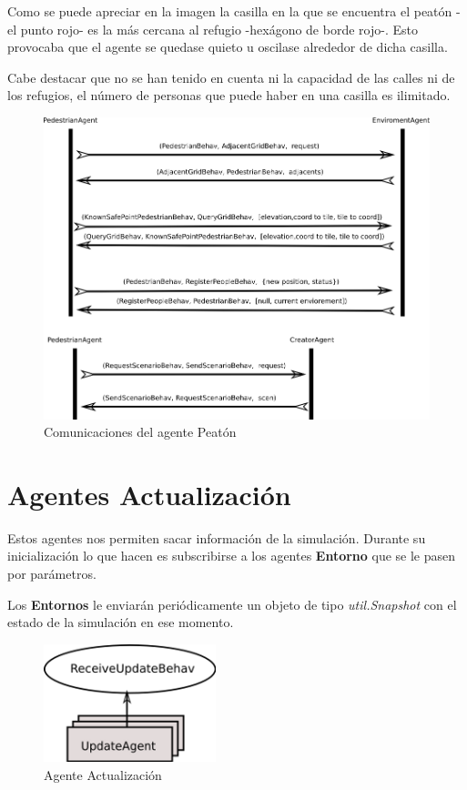 Como se puede apreciar en la imagen la casilla en la que se encuentra el peatón
-el punto rojo- es la más cercana al refugio -hexágono de borde rojo-. Esto
provocaba que el agente se quedase quieto u oscilase alrededor de dicha casilla.

Cabe destacar que no se han tenido en cuenta ni la capacidad de las calles ni
de los refugios, el número de personas que puede haber en una casilla es
ilimitado.

\begin{figure}[H]
 \centering
 \includegraphics[width=135mm]{figuras/cap5/com_pedestrian.png}
 \caption{Comunicaciones del agente Peatón}
\end{figure}

\section{Agentes Actualización}

Estos agentes nos permiten sacar información de la simulación. Durante su
inicialización lo que hacen es subscribirse a los agentes {\bf Entorno} que se
le pasen por parámetros.

Los {\bf Entornos} le enviarán periódicamente un objeto de tipo {\em
util.Snapshot} con el estado de la simulación en ese momento.

\begin{figure}[H]
 \centering
 \includegraphics[width=50mm]{figuras/cap5/ag_update.png}
 \caption{Agente Actualización}
\end{figure}

